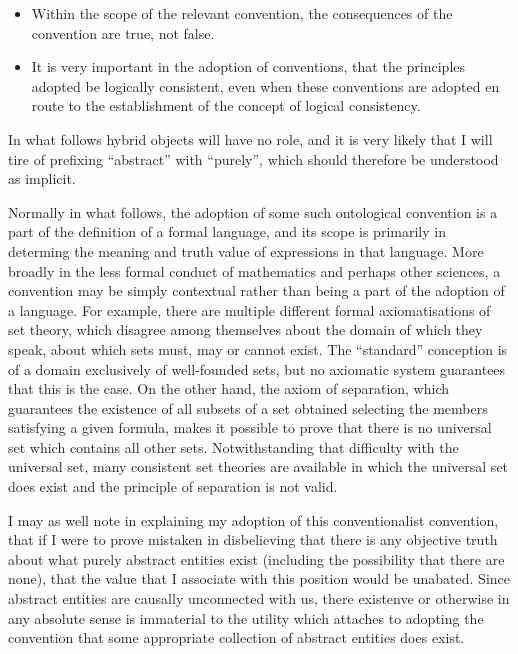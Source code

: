 \documentclass[10pt,titlepage]{book}
\begin{document}
\begin{itemize}
\item Within the scope of the relevant convention, the consequences of the convention are true, not false.
\item It is very important in the adoption of conventions, that the principles adopted be logically consistent, even when these conventions are adopted en route to the establishment of the concept of logical consistency.
\end{itemize}

In what follows hybrid objects will have no role, and it is very likely that I will tire of prefixing ``abstract'' with ``purely'', which should therefore be understood as implicit.

Normally in what follows, the adoption of some such ontological convention is a part of the definition of a formal language, and its scope is primarily in determing the meaning and truth value of expressions in that language.
More broadly in the less formal conduct of mathematics and perhaps other sciences, a convention may be simply contextual rather than being a part of the adoption of a language.
For example, there are multiple different formal axiomatisations of set theory, which disagree among themselves about the domain of which they speak, about which sets must, may or cannot exist.
The ``standard'' conception is of a domain exclusively of well-founded sets, but no axiomatic system guarantees that this is the case.
On the other hand, the axiom of separation, which guarantees the existence of all subsets of a set obtained selecting the members satisfying a given formula, makes it possible to prove that there is no universal set which contains all other sets.
Notwithstanding that difficulty with the universal set, many consistent set theories are available in which the universal set does exist and the principle of separation is not valid.

I may as well note in explaining my adoption of this conventionalist convention, that if I were to prove mistaken in disbelieving that there is any objective truth about what purely abstract entities exist (including the possibility that there are none), that the value that I associate with this position would be unabated.
Since abstract entities are causally unconnected with us, there existenve or otherwise in any absolute sense is immaterial to the utility which attaches to adopting the convention that some appropriate collection of abstract entities does exist.
\end{document}
